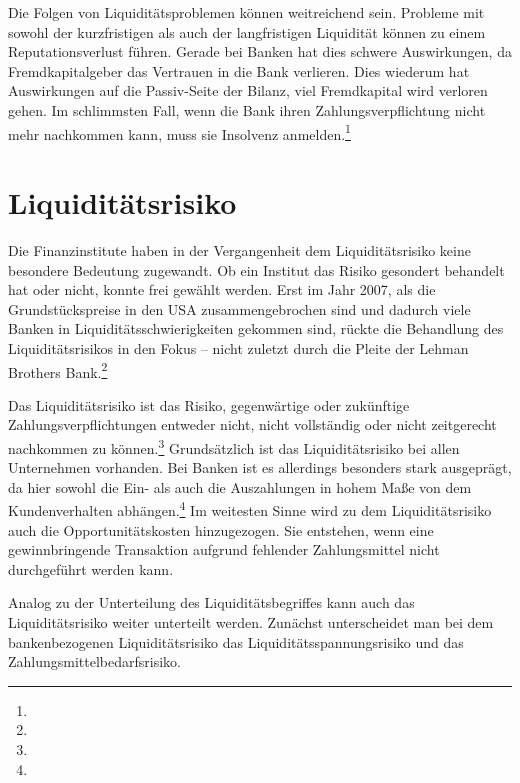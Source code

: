 \begin{onehalfspacing}
Die Folgen von Liquiditätsproblemen können weitreichend sein. Probleme mit sowohl der kurzfristigen als auch der langfristigen Liquidität können zu einem Reputationsverlust führen. Gerade bei Banken hat dies schwere Auswirkungen, da Fremdkapitalgeber das Vertrauen in die Bank verlieren. Dies wiederum hat Auswirkungen auf die Passiv-Seite der Bilanz, viel Fremdkapital wird verloren gehen. Im schlimmsten Fall, wenn die Bank ihren Zahlungsverpflichtung nicht mehr nachkommen kann, muss sie Insolvenz anmelden.\footnote{ }

\section{Liquiditätsrisiko}
Die Finanzinstitute haben in der Vergangenheit dem Liquiditätsrisiko keine besondere Bedeutung zugewandt. Ob ein Institut das Risiko gesondert behandelt hat oder nicht, konnte frei gewählt werden. Erst im Jahr 2007, als die Grundstückspreise in den USA zusammengebrochen sind und dadurch viele Banken in Liquiditätsschwierigkeiten gekommen sind, rückte die Behandlung des Liquiditätsrisikos in den Fokus -- nicht zuletzt durch die Pleite der Lehman Brothers Bank.\footnote{ }


Das Liquiditätsrisiko ist das Risiko, gegenwärtige oder zukünftige Zahlungsverpflichtungen entweder nicht, nicht vollständig oder nicht zeitgerecht nachkommen zu können.\footnote{  } Grundsätzlich ist das Liquiditätsrisiko bei allen Unternehmen vorhanden. Bei Banken ist es allerdings besonders stark ausgeprägt, da hier sowohl die Ein- als auch die Auszahlungen in hohem Maße von dem Kundenverhalten abhängen.\footnote{ } Im weitesten Sinne wird zu dem Liquiditätsrisiko auch die Opportunitätskosten hinzugezogen. Sie entstehen, wenn eine gewinnbringende Transaktion aufgrund fehlender Zahlungsmittel nicht durchgeführt werden kann.

Analog zu der Unterteilung des Liquiditätsbegriffes kann auch das Liquiditätsrisiko weiter unterteilt werden. Zunächst unterscheidet man bei dem bankenbezogenen Liquiditätsrisiko das Liquiditätsspannungsrisiko und das Zahlungsmittelbedarfsrisiko.


\end{onehalfspacing}
